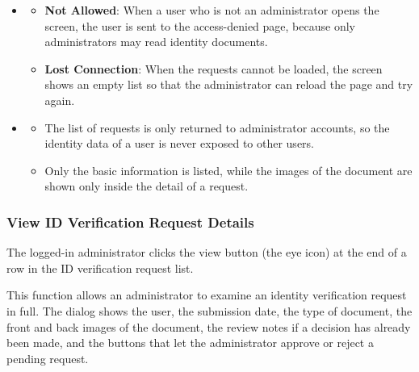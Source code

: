 \begin{itemize}[leftmargin=1.6em,topsep=4pt,itemsep=3pt,parsep=0pt,label=$\bullet$]
\begin{itemize}[leftmargin=2.2em,topsep=2pt,itemsep=3pt,parsep=0pt,label=$\circ$]
            \item The administrator sees the requests that match the chosen status and search text.
            \item No data is changed by this function, so the requests stay exactly as they were.
        \end{itemize}
    \item {}
        \begin{itemize}[leftmargin=2.2em,topsep=2pt,itemsep=3pt,parsep=0pt,label=$\circ$]
            \item \textbf{Not Allowed}: When a user who is not an administrator opens the screen, the user is sent to the access-denied page, because only administrators may read identity documents.
            \item \textbf{Lost Connection}: When the requests cannot be loaded, the screen shows an empty list so that the administrator can reload the page and try again.
        \end{itemize}
    \item {}
        \begin{itemize}[leftmargin=2.2em,topsep=2pt,itemsep=3pt,parsep=0pt,label=$\circ$]
            \item The list of requests is only returned to administrator accounts, so the identity data of a user is never exposed to other users.
            \item Only the basic information is listed, while the images of the document are shown only inside the detail of a request.
        \end{itemize}
\end{itemize}


\subsubsection{View ID Verification Request Details}

 The logged-in administrator clicks the view button (the eye icon) at the end of a row in the ID verification request list.

 This function allows an administrator to examine an identity verification request in full. The dialog shows the user, the submission date, the type of document, the front and back images of the document, the review notes if a decision has already been made, and the buttons that let the administrator approve or reject a pending request.

